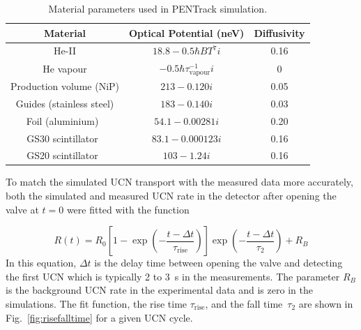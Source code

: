 

\begin{table}
  \centering
  \begin{tabular}{|c|c|c|}
    \hline
    Material & Optical Potential (neV) & Diffusivity \\
    \hline
    He-II  & $18.8 - 0.5\hbar B T^7 i$ & 0.16 \\
    He vapour & $-0.5 \hbar \tau^{-1}_\mathrm{vapour} i$ & 0 \\
    Production volume (NiP) & $213 - 0.120 i$ & 0.05 \\
    Guides (stainless steel) & $183 - 0.140 i$ & 0.03 \\
    Foil (aluminium)~\cite{atchison2009transmission} & $54.1 - 0.00281 i$ & 0.20 \\
    GS30 scintillator~\cite{Ban2016} & $83.1 - 0.000123 i$ & 0.16 \\
    GS20 scintillator~\cite{Ban2016} & $103 - 1.24 i$ & 0.16 \\
    \hline
  \end{tabular}
  \caption{Material parameters used in PENTrack
    simulation.}
  \label{tab:materials}
\end{table}

To match the simulated UCN transport with the measured data more
accurately, both the simulated and measured UCN rate in the detector
after opening the valve at $t=0$ were fitted with the function

\begin{equation}
R(t) = R_0 \left[ 1 - \exp \left( -\frac{t - \Delta t}{\tau_\mathrm{rise}} \right) \right] \exp \left( -\frac{t - \Delta t}{\tau_2} \right) + R_B
\end{equation}
In this equation, $\Delta t$ is the delay time between opening the
valve and detecting the first UCN which is typically 2 to 3~s in the
measurements. The parameter $R_B$ is the background UCN rate in the
experimental data and is zero in the simulations. The fit function,
the rise time $\tau_{\mathrm{rise}}$, and the fall time~$\tau_2$ are
shown in Fig.~\ref{fig:risefalltime} for a given UCN cycle.


